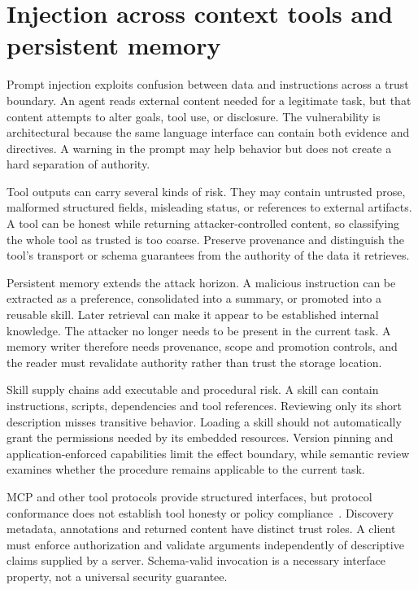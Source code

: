 \section{Injection across context tools and persistent memory}\label{sec:C28:injection}
Prompt injection exploits confusion between data and instructions across a trust boundary. An agent reads external content needed for a legitimate task, but that content attempts to alter goals, tool use, or disclosure. The vulnerability is architectural because the same language interface can contain both evidence and directives. A warning in the prompt may help behavior but does not create a hard separation of authority.

Tool outputs can carry several kinds of risk. They may contain untrusted prose, malformed structured fields, misleading status, or references to external artifacts. A tool can be honest while returning attacker-controlled content, so classifying the whole tool as trusted is too coarse. Preserve provenance and distinguish the tool's transport or schema guarantees from the authority of the data it retrieves.

Persistent memory extends the attack horizon. A malicious instruction can be extracted as a preference, consolidated into a summary, or promoted into a reusable skill. Later retrieval can make it appear to be established internal knowledge. The attacker no longer needs to be present in the current task. A memory writer therefore needs provenance, scope and promotion controls, and the reader must revalidate authority rather than trust the storage location.

Skill supply chains add executable and procedural risk. A skill can contain instructions, scripts, dependencies and tool references. Reviewing only its short description misses transitive behavior. Loading a skill should not automatically grant the permissions needed by its embedded resources. Version pinning and application-enforced capabilities limit the effect boundary, while semantic review examines whether the procedure remains applicable to the current task.

MCP and other tool protocols provide structured interfaces, but protocol conformance does not establish tool honesty or policy compliance~\cite{mcp2026spec}. Discovery metadata, annotations and returned content have distinct trust roles. A client must enforce authorization and validate arguments independently of descriptive claims supplied by a server. Schema-valid invocation is a necessary interface property, not a universal security guarantee.


